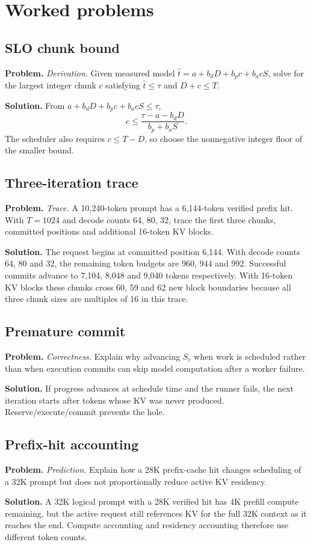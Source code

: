 \section{Worked problems}

\subsection{SLO chunk bound}
\textbf{Problem.} \emph{Derivation.} Given measured model
$\hat t=a+b_dD+b_pc+b_acS$, solve for the largest integer chunk $c$ satisfying
$\hat t\le\tau$ and $D+c\le T$.

\textbf{Solution.} From $a+b_dD+b_pc+b_acS\le\tau$,
\[
c\le\frac{\tau-a-b_dD}{b_p+b_aS}.
\]
The scheduler also requires $c\le T-D$, so choose the nonnegative integer floor of
the smaller bound.

\subsection{Three-iteration trace}
\textbf{Problem.} \emph{Trace.} A 10,240-token prompt has a 6,144-token verified prefix hit.
With $T=1024$ and decode counts 64, 80, 32, trace the first three chunks, committed
positions and additional 16-token KV blocks.

\textbf{Solution.} The request begins at committed position 6,144. With decode counts 64, 80 and 32,
the remaining token budgets are 960, 944 and 992. Successful commits advance to
7,104, 8,048 and 9,040 tokens respectively. With 16-token KV blocks these chunks
cross 60, 59 and 62 new block boundaries because all three chunk sizes are multiples
of 16 in this trace.

\subsection{Premature commit}
\textbf{Problem.} \emph{Correctness.} Explain why advancing $S_c$ when work is scheduled rather
than when execution commits can skip model computation after a worker failure.

\textbf{Solution.} If progress advances at schedule time and the runner fails, the next iteration starts
after tokens whose KV was never produced. Reserve/execute/commit prevents the hole.

\subsection{Prefix-hit accounting}
\textbf{Problem.} \emph{Prediction.} Explain how a 28K prefix-cache hit changes scheduling of a
32K prompt but does not proportionally reduce active KV residency.

\textbf{Solution.} A 32K logical prompt with a 28K verified hit has 4K prefill compute remaining, but
the active request still references KV for the full 32K context as it reaches the end.
Compute accounting and residency accounting therefore use different token counts.
